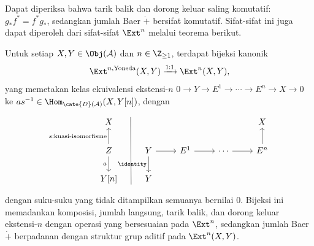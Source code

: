 Dapat diperiksa bahwa tarik balik dan dorong keluar saling komutatif:
$g_* f^* = f^* g_*$, sedangkan jumlah Baer $\dot{+}$ bersifat komutatif.
Sifat-sifat ini juga dapat diperoleh dari sifat-sifat $\Ext^n$ melalui teorema
berikut.

\begin{teorema}\label{prop:Yoneda-Ext}
	Untuk setiap $X, Y \in \Obj(\mathcal{A})$ dan $n \in \Z_{\geq 1}$,
	terdapat bijeksi kanonik
	\[ \Ext^{n, \text{Yoneda}}(X, Y) \xrightarrow{1:1} \Ext^n(X, Y), \]
	yang memetakan kelas ekuivalensi ekstensi-$n$
	$0 \to Y \to E^1 \to \cdots \to E^n \to X \to 0$ ke
	$as^{-1} \in \Hom_{\cate{D}(\mathcal{A})}(X, Y[n])$, dengan
	\[\begin{tikzcd}
		X \arrow[phantom, r, "" {name=A, yshift=2ex}] & {} & & & X \\
		Z \arrow[u, "{s: \text{kuasi-isomorfisme}}"] \arrow[d, "a"'] & Y \arrow[r] \arrow[d, "\identity"'] & E^1 \arrow[r] & \cdots \arrow[r] & E^n \arrow[u] \\
		Y[n] \arrow[phantom, r, "" {name=B, yshift=-2ex}] & Y & & &
		\arrow[dash, from=A, to=B]
	\end{tikzcd}\]
	dengan suku-suku yang tidak ditampilkan semuanya bernilai $0$. Bijeksi ini
	memadankan komposisi, jumlah langsung, tarik balik, dan dorong keluar
	ekstensi-$n$ dengan operasi yang bersesuaian pada $\Ext^n$, sedangkan jumlah
	Baer $\dot{+}$ berpadanan dengan struktur grup aditif pada
	$\Ext^n(X, Y)$.
\end{teorema}

